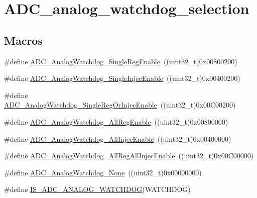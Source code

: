 \hypertarget{group___a_d_c__analog__watchdog__selection}{}\section{A\+D\+C\+\_\+analog\+\_\+watchdog\+\_\+selection}
\label{group___a_d_c__analog__watchdog__selection}
\subsection*{Macros}
\begin{DoxyCompactItemize}
\item 
\#define \mbox{\hyperlink{group___a_d_c__analog__watchdog__selection_ga2975552a752f44085d9da54b4e76121e}{A\+D\+C\+\_\+\+Analog\+Watchdog\+\_\+\+Single\+Reg\+Enable}}~((uint32\+\_\+t)0x00800200)
\item 
\#define \mbox{\hyperlink{group___a_d_c__analog__watchdog__selection_gaa9904271617ab69593ac68ae540047fb}{A\+D\+C\+\_\+\+Analog\+Watchdog\+\_\+\+Single\+Injec\+Enable}}~((uint32\+\_\+t)0x00400200)
\item 
\#define \mbox{\hyperlink{group___a_d_c__analog__watchdog__selection_gaffd35fc6ceb226ec3fb61fb52227820c}{A\+D\+C\+\_\+\+Analog\+Watchdog\+\_\+\+Single\+Reg\+Or\+Injec\+Enable}}~((uint32\+\_\+t)0x00\+C00200)
\item 
\#define \mbox{\hyperlink{group___a_d_c__analog__watchdog__selection_ga37f08e1a4a452a2c148341b3cfcdeb1e}{A\+D\+C\+\_\+\+Analog\+Watchdog\+\_\+\+All\+Reg\+Enable}}~((uint32\+\_\+t)0x00800000)
\item 
\#define \mbox{\hyperlink{group___a_d_c__analog__watchdog__selection_gae4d6a7ebb136d924f0c8bad2cbac0574}{A\+D\+C\+\_\+\+Analog\+Watchdog\+\_\+\+All\+Injec\+Enable}}~((uint32\+\_\+t)0x00400000)
\item 
\#define \mbox{\hyperlink{group___a_d_c__analog__watchdog__selection_ga25a299f4493aaae316521351198df084}{A\+D\+C\+\_\+\+Analog\+Watchdog\+\_\+\+All\+Reg\+All\+Injec\+Enable}}~((uint32\+\_\+t)0x00\+C00000)
\item 
\#define \mbox{\hyperlink{group___a_d_c__analog__watchdog__selection_ga91f69979e0e449fef5a8b225a21e3eb9}{A\+D\+C\+\_\+\+Analog\+Watchdog\+\_\+\+None}}~((uint32\+\_\+t)0x00000000)
\item 
\#define \mbox{\hyperlink{group___a_d_c__analog__watchdog__selection_ga53ffa30f756569194342bfba80165544}{I\+S\+\_\+\+A\+D\+C\+\_\+\+A\+N\+A\+L\+O\+G\+\_\+\+W\+A\+T\+C\+H\+D\+OG}}(W\+A\+T\+C\+H\+D\+OG)
\end{DoxyCompactItemize}


